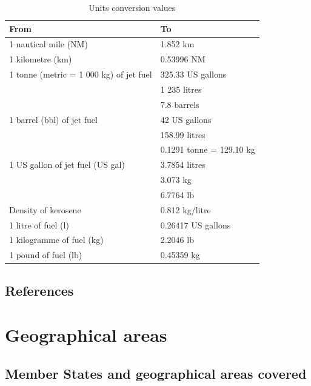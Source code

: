 \documentclass[
  11pt,
  a4paper,
]{book}
\begin{document}

\hypertarget{tbl-conversion-values}{}
\begin{longtable}{ll}
\caption{\label{tbl-conversion-values}Units conversion values }\tabularnewline

\toprule
From & To \\ 
\midrule
1 nautical mile (NM) & 1.852 km \\ 
1 kilometre (km) & 0.53996 NM \\ 
1 tonne (metric = 1 000 kg) of jet fuel & 325.33 US gallons \\ 
 & 1 235 litres \\ 
 & 7.8 barrels \\ 
1 barrel (bbl) of jet fuel & 42 US gallons \\ 
 & 158.99 litres \\ 
 & 0.1291 tonne = 129.10 kg \\ 
1 US gallon of jet fuel (US gal) & 3.7854 litres \\ 
 & 3.073 kg \\ 
 & 6.7764 lb \\ 
Density of kerosene & 0.812 kg/litre \\ 
1 litre of fuel (l) & 0.26417 US gallons \\ 
1 kilogramme of fuel (kg) & 2.2046 lb \\ 
1 pound of fuel (lb) & 0.45359 kg \\ 
\bottomrule
\end{longtable}

\hypertarget{references}{%
\section*{References}\label{references}}



\hypertarget{sec-geographical-areas}{%
\chapter*{Geographical areas}\label{sec-geographical-areas}}


\hypertarget{member-states-and-geographical-areas-covered}{%
\section*{Member States and geographical areas
covered}\label{member-states-and-geographical-areas-covered}}
\end{document}
